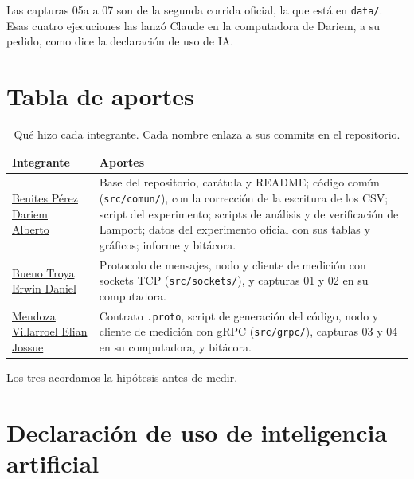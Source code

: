 \documentclass[11pt,a4paper]{article}
\newcommand{\repourl}{https://github.com/DALBEZ-ROG/AD-PE-U1-BBM}
\begin{document}
Las capturas 05a a 07 son de la segunda corrida oficial, la que está en \texttt{data/}. Esas cuatro ejecuciones las lanzó Claude en la computadora de Dariem, a su pedido, como dice la declaración de uso de IA.

\section{Tabla de aportes}

\begin{table}[H]
\centering
\caption{Qué hizo cada integrante. Cada nombre enlaza a sus commits en el repositorio.}
\label{tab:aportes}
\small
\begin{tabularx}{\textwidth}{>{\raggedright\arraybackslash}p{3.6cm} >{\raggedright\arraybackslash}X}
\toprule
Integrante & Aportes \\
\midrule
\href{\repourl/commits/main?author=DALBEZ-ROG}{Benites Pérez Dariem Alberto} & Base del repositorio, carátula y README; código común (\texttt{src/comun/}), con la corrección de la escritura de los CSV; script del experimento; scripts de análisis y de verificación de Lamport; datos del experimento oficial con sus tablas y gráficos; informe y bitácora. \\
\href{\repourl/commits/main?author=Troyano2004}{Bueno Troya Erwin Daniel} & Protocolo de mensajes, nodo y cliente de medición con sockets TCP (\texttt{src/sockets/}), y capturas 01 y 02 en su computadora. \\
\href{\repourl/commits/main?author=Elianmen123}{Mendoza Villarroel Elian Jossue} & Contrato \texttt{.proto}, script de generación del código, nodo y cliente de medición con gRPC (\texttt{src/grpc/}), capturas 03 y 04 en su computadora, y bitácora. \\
\bottomrule
\end{tabularx}
\end{table}

Los tres acordamos la hipótesis antes de medir.

\section{Declaración de uso de inteligencia artificial}
\end{document}
